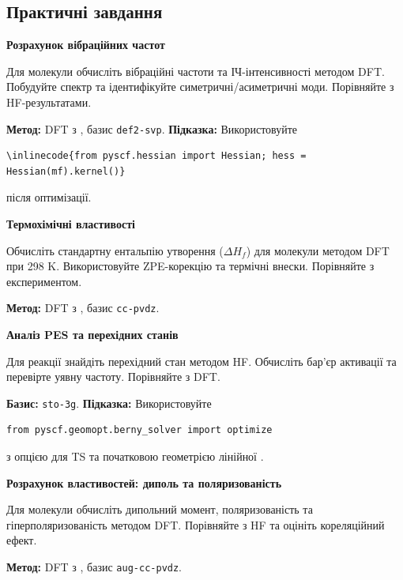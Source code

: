 \subsection*{Практичні завдання}

\begin{tasks}

\item \textbf{Розрахунок вібраційних частот}

Для молекули  обчисліть вібраційні частоти та ІЧ-інтенсивності методом DFT. Побудуйте спектр та ідентифікуйте симетричні/асиметричні моди. Порівняйте з HF-результатами.

\textbf{Метод:} DFT з , базис \texttt{def2-svp}.
\textbf{Підказка:} Використовуйте
\begin{verbatim}
\inlinecode{from pyscf.hessian import Hessian; hess = Hessian(mf).kernel()}
\end{verbatim}
після оптимізації.

\item \textbf{Термохімічні властивості}

Обчисліть стандартну ентальпію утворення ($\Delta H_f$) для молекули  методом DFT при 298 K. Використовуйте ZPE-корекцію та термічні внески. Порівняйте з експериментом.

\textbf{Метод:} DFT з , базис \texttt{cc-pvdz}.

\item \textbf{Аналіз PES та перехідних станів}

Для реакції  знайдіть перехідний стан методом HF. Обчисліть бар'єр активації та перевірте уявну частоту. Порівняйте з DFT.

\textbf{Базис:} \texttt{sto-3g}.
\textbf{Підказка:} Використовуйте
\begin{verbatim}
from pyscf.geomopt.berny_solver import optimize
\end{verbatim}
з опцією для TS та початковою геометрією лінійної .

\item \textbf{Розрахунок властивостей: диполь та поляризованість}

Для молекули  обчисліть дипольний момент, поляризованість та гіперполяризованість методом DFT. Порівняйте з HF та оцініть кореляційний ефект.

\textbf{Метод:} DFT з , базис \texttt{aug-cc-pvdz}.

\end{tasks}